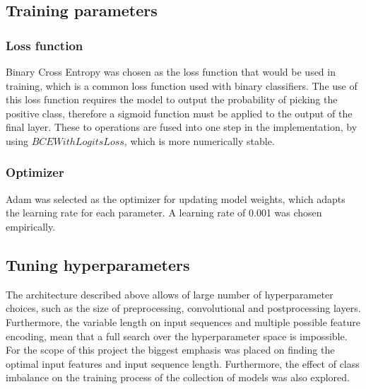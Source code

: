 \subsection{Training parameters}

\subsubsection{Loss function}
Binary Cross Entropy was chosen as the loss function that would be used in training, which is a common loss function used with binary classifiers. 
The use of this loss function requires the model to output the probability of picking the positive class, therefore a sigmoid function must be applied to the output of the final layer.
These to operations are fused into one step in the implementation, by using  $BCEWithLogitsLoss$, which is more numerically stable. 

\subsubsection{Optimizer}
Adam was selected as the optimizer for updating model weights, which adapts the learning rate for each parameter. A learning rate of 0.001 was chosen empirically.

\subsection{Tuning hyperparameters}
The architecture described above allows of large number of hyperparameter choices, such as the size of preprocessing, convolutional and postprocessing layers. Furthermore, the variable length on input sequences and multiple possible feature encoding, mean that a full search over the hyperparameter space is impossible. For the scope of this project the biggest emphasis was placed on finding the optimal input features and input sequence length. Furthermore, the effect of class imbalance on the training process of the collection of models was also explored.